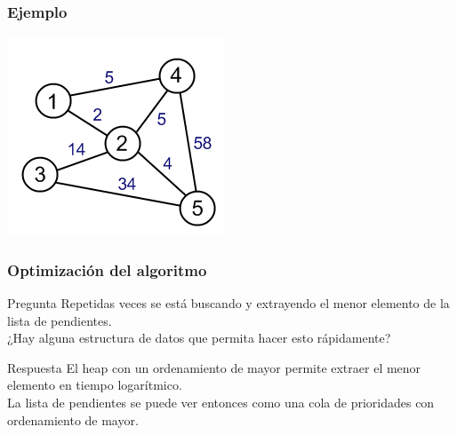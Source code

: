 \documentclass{beamer}
\begin{document}
	\begin{frame}
		\frametitle{Ejemplo}
		\begin{center}
			\includegraphics[height = 0.7\textheight]{dijkstra.png}
		\end{center}
	\end{frame}
	
	\begin{frame}
		\frametitle{Optimización del algoritmo}
		\begin{alertblock}{Pregunta}
			Repetidas veces se está buscando y extrayendo el menor elemento de la lista de pendientes.\\
			¿Hay alguna estructura de datos que permita hacer esto rápidamente?
		\end{alertblock}
		\pause
		\begin{exampleblock}{Respuesta}
			El heap con un ordenamiento de mayor permite extraer el menor elemento en tiempo logarítmico.\\
			La lista de pendientes se puede ver entonces como una cola de prioridades con ordenamiento de mayor.
		\end{exampleblock}
	\end{frame}
	
\end{document}
